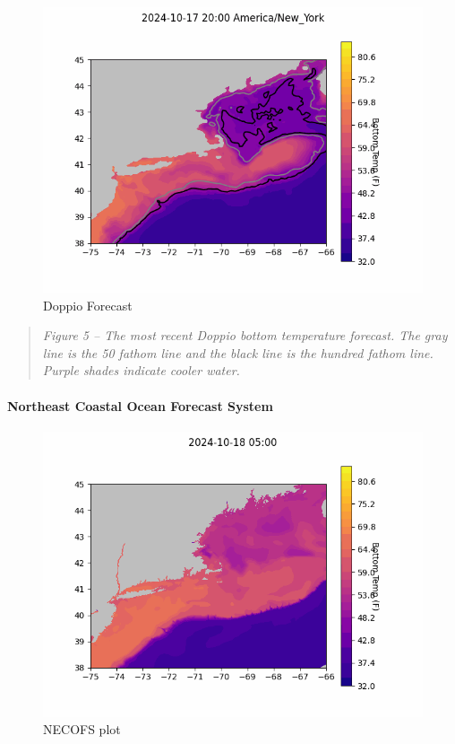 \documentclass[
]{article}
\begin{document}
\begin{figure}
\centering
\includegraphics{DOPPIO_forecast_F.gif}
\caption{Doppio Forecast}
\end{figure}

\begin{quote}
\emph{Figure 5 -- The most recent Doppio bottom temperature forecast.
The gray line is the 50 fathom line and the black line is the hundred
fathom line. Purple shades indicate cooler water.}
\end{quote}

\hypertarget{northeast-coastal-ocean-forecast-system}{%
\paragraph{Northeast Coastal Ocean Forecast
System}\label{northeast-coastal-ocean-forecast-system}}

\begin{figure}
\centering
\includegraphics{NECOFS_GOM.gif}
\caption{NECOFS plot}
\end{figure}
\end{document}
